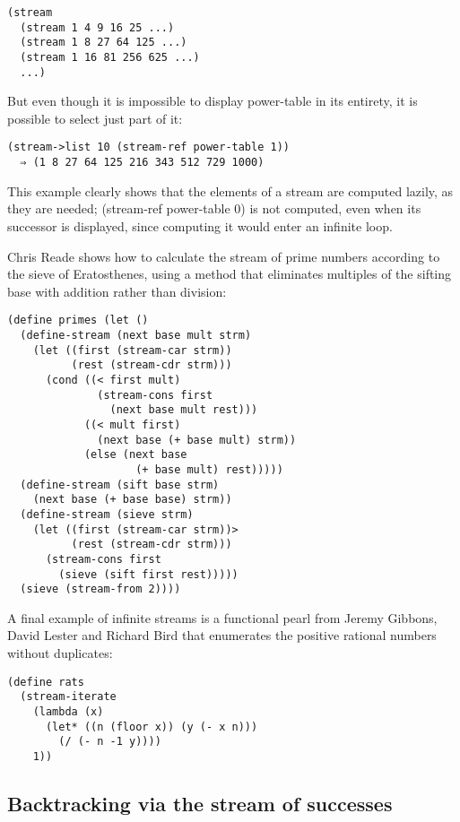 \begin{verbatim}
(stream
  (stream 1 4 9 16 25 ...)
  (stream 1 8 27 64 125 ...)
  (stream 1 16 81 256 625 ...)
  ...)
\end{verbatim}

But even though it is impossible to display power-table in its entirety,
it is possible to select just part of it:

\begin{verbatim}
(stream->list 10 (stream-ref power-table 1))
  ⇒ (1 8 27 64 125 216 343 512 729 1000)
\end{verbatim}

This example clearly shows that the elements of a stream are computed
lazily, as they are needed; (stream-ref power-table 0) is not computed,
even when its successor is displayed, since computing it would enter an
infinite loop.

Chris Reade shows how to calculate the stream of prime numbers according
to the sieve of Eratosthenes, using a method that eliminates multiples
of the sifting base with addition rather than division:

\begin{verbatim}
(define primes (let ()
  (define-stream (next base mult strm)
    (let ((first (stream-car strm))
          (rest (stream-cdr strm)))
      (cond ((< first mult)
              (stream-cons first
                (next base mult rest)))
            ((< mult first)
              (next base (+ base mult) strm))
            (else (next base
                    (+ base mult) rest)))))
  (define-stream (sift base strm)
    (next base (+ base base) strm))
  (define-stream (sieve strm)
    (let ((first (stream-car strm))>
          (rest (stream-cdr strm)))
      (stream-cons first
        (sieve (sift first rest)))))
  (sieve (stream-from 2))))
\end{verbatim}

A final example of infinite streams is a functional pearl from Jeremy
Gibbons, David Lester and Richard Bird that enumerates the positive
rational numbers without duplicates:

\begin{verbatim}
(define rats
  (stream-iterate
    (lambda (x)
      (let* ((n (floor x)) (y (- x n)))
        (/ (- n -1 y))))
    1))
\end{verbatim}

\subsection{Backtracking via the stream of
successes}\label{backtracking-via-the-stream-of-successes}

